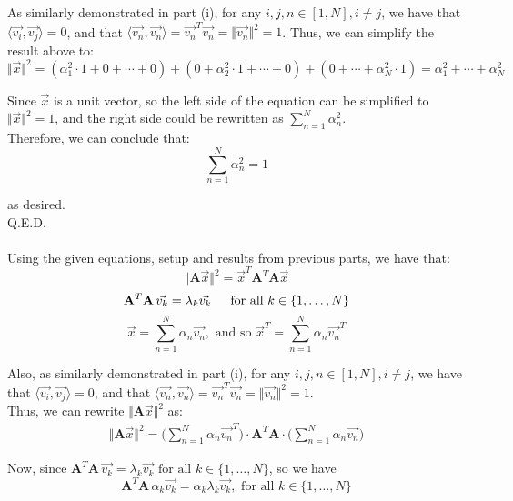 \documentclass{article}
\begin{document}
As similarly demonstrated in part (i), for any $i,j,n\in[1,N], i\neq j$, we have that
$\langle \vec{v_i}, \vec{v_j} \rangle = 0$, and that
$\langle \vec{v_n}, \vec{v_n} \rangle =
\vec{v_n}^T \vec{v_n} = \Vert\vec{v_n}\Vert^2 = 1$. Thus, we can simplify the result above to:
$$\Vert\vec{x}\Vert^2 =
(\alpha_1^{2}\cdot1 + 0 + \cdots + 0) +
	(0 + \alpha_2^{2}\cdot1 + \cdots + 0) +
	(0 + \cdots + \alpha_N^{2}\cdot1) =
\alpha_1^{2} + \cdots + \alpha_N^{2} $$

Since $\vec{x}$ is a unit vector, so the left side of the equation can be simplified to $\Vert\vec{x}\Vert^2 = 1$, and the right side could be rewritten as $\sum\limits_{n=1}^N \alpha_n^2$. \\

Therefore, we can conclude that:
$$\sum\limits_{n=1}^N \alpha_n^2 = 1$$

as desired. \\

Q.E.D. \\[.5cm]



\pagebreak{} \\

Using the given equations, setup and results from previous parts, we have that:
$$\Vert\mathbf{A}\vec{x}\Vert^2 =
\vec{x}^T \mathbf{A}^T \mathbf{A} \vec{x}$$
$$\mathbf{A}^T\mathbf{A}\, \vec{v_k} = \lambda_k \vec{v_k}
	\indent \text{for all } k\in\{1,\dots, N\}$$
$$\vec{x} = \sum\limits_{n=1}^{N} \alpha_{n}\vec{v_n},
	\text{ and so }
	\vec{x}^T =
	\sum\limits_{n=1}^{N} \alpha_{n}\vec{v_n}^T$$

Also, as similarly demonstrated in part (i), for any $i,j,n\in[1,N], i\neq j$, we have that
$\langle \vec{v_i}, \vec{v_j} \rangle = 0$, and that
$\langle \vec{v_n}, \vec{v_n} \rangle =
\vec{v_n}^T \vec{v_n} = \Vert\vec{v_n}\Vert^2 = 1$. \\

Thus, we can rewrite $\Vert\mathbf{A}\vec{x}\Vert^2$ as:
\begin{align}
\Vert\mathbf{A}\vec{x}\Vert^2 =
\Big(\sum\limits_{n=1}^{N} \alpha_{n}\vec{v_n}^T\Big) \cdot
	\mathbf{A}^T\mathbf{A} \cdot
	\Big(\sum\limits_{n=1}^{N} \alpha_{n}\vec{v_n} \Big)
\end{align}

Now, since $\mathbf{A}^T\mathbf{A}\, \vec{v_k} = \lambda_k \vec{v_k} \text{ for all } k\in\{1,\dots, N\}$, so we have
$$\mathbf{A}^T\mathbf{A}\, \alpha_k\vec{v_k} = \alpha_k\lambda_k \vec{v_k}, \text{ for all } k\in\{1,\dots, N\}$$
\end{document}
